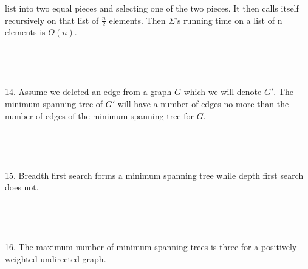 \documentclass[12pt]{article}
\begin{document}
list into two equal pieces and selecting one of the two pieces. It 
then calls itself recursively on that list of $\frac{n}{2}$ elements. Then $\Sigma$'s 
running time on a list of n elements is $O(n)$.\\\\\\\\\\
14. Assume we deleted an edge from a graph $G$ which we will denote $G'$. The minimum spanning tree of $G'$ will 
have a number of edges no more than the number of edges of the minimum spanning tree for $G$.\\\\\\\\\\
15. Breadth first search forms a minimum spanning tree while depth first search does not.\\\\\\\\\\
16. The maximum number of minimum spanning trees is three for a positively weighted undirected graph.
\end{document}
